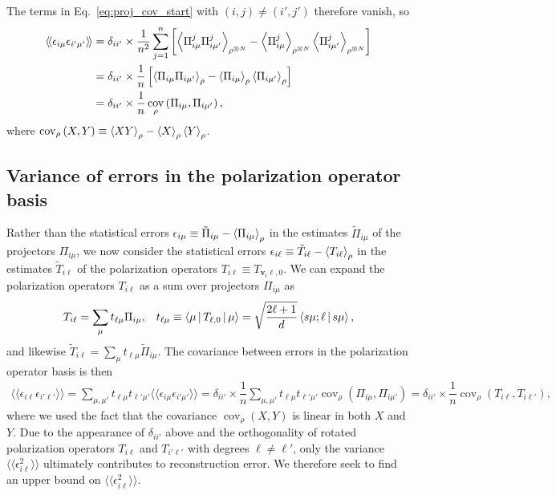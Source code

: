 \documentclass[notitlepage,twocolumn]{revtex4-2}
\newcommand{\f}[2]{\dfrac{#1}{#2}} %
\newcommand{\p}[1]{\left(#1\right)} %
\renewcommand{\sp}[1]{\left[#1\right]} %
\newcommand{\bk}{\Braket} %
\renewcommand{\v}{\bm} %
\newcommand{\bbk}[1]{\langle\!\langle #1 \rangle\!\rangle}
\DeclareMathOperator{\cov}{cov}
\begin{document}
The terms in Eq.~\eqref{eq:proj_cov_start} with $\p{i,j}\ne\p{i',j'}$ therefore vanish, so
\begin{align}
  \bbk{\epsilon_{i\mu} \epsilon_{i'\mu'}}
  &= \delta_{ii'} \times \f1{n^2} \sum_{j=1}^n \sp{\bk{\Pi_{i\mu}^j \Pi_{i\mu'}^j}_{\rho^{\otimes N}}
    - \bk{\Pi_{i\mu}^j}_{\rho^{\otimes N}}
    \bk{\Pi_{i\mu'}^j}_{\rho^{\otimes N}}} \\
  &= \delta_{ii'} \times \f1n \sp{\bk{\Pi_{i\mu} \Pi_{i\mu'}}_\rho
    - \bk{\Pi_{i\mu}}_\rho \bk{\Pi_{i\mu'}}_\rho} \\
  &= \delta_{ii'} \times \f1n \cov_\rho\p{\Pi_{i\mu}, \Pi_{i\mu'}},
\end{align}
where $\cov_\rho\p{X,Y} \equiv \bk{XY}_\rho - \bk{X}_\rho \bk{Y}_\rho$.

\subsection{Variance of errors in the polarization operator basis}

Rather than the statistical errors $\epsilon_{i\mu} \equiv \tilde\Pi_{i\mu} - \bk{\Pi_{i\mu}}_\rho$ in the estimates $\tilde\Pi_{i\mu}$ of the projectors $\Pi_{i\mu}$, we now consider the statistical errors $\epsilon_{i\ell} \equiv \tilde T_{i\ell} - \bk{T_{i\ell}}_\rho$ in the estimates $\tilde T_{i\ell}$ of the polarization operators $T_{i\ell} \equiv T_{\v v_i\ell,0}$.
We can expand the polarization operators $T_{i\ell}$ as a sum over projectors $\Pi_{i\mu}$ as
\begin{align}
  T_{i\ell} = \sum_\mu t_{\ell\mu} \Pi_{i\mu},
  &&
  t_{\ell\mu} \equiv \bk{\mu|T_{\ell,0}|\mu}
  = \sqrt{\f{2\ell+1}{d}} \bk{s\mu;\ell|s\mu},
\end{align}
and likewise $\tilde T_{i\ell} = \sum_\mu t_{\ell\mu} \tilde\Pi_{i\mu}$.
The covariance between errors in the polarization operator basis is then
\begin{align}
  \bbk{\epsilon_{i\ell} \epsilon_{i'\ell'}}
  = \sum_{\mu,\mu'} t_{\ell\mu} t_{\ell'\mu'}
  \bbk{\epsilon_{i\mu} \epsilon_{i'\mu'}}
  = \delta_{ii'} \times \f1n
  \sum_{\mu,\mu'} t_{\ell\mu} t_{\ell'\mu'}
  \cov_\rho\p{\Pi_{i\mu}, \Pi_{i\mu'}}
  = \delta_{ii'} \times \f1n \cov_\rho\p{T_{i\ell}, T_{i\ell'}},
\end{align}
where we used the fact that the covariance $\cov_\rho\p{X,Y}$ is linear in both $X$ and $Y$.
Due to the appearance of $\delta_{ii'}$ above and the orthogonality of rotated polarization operators $T_{i\ell}$ and $T_{i'\ell'}$ with degrees $\ell\ne\ell'$, only the variance $\bbk{\epsilon_{i\ell}^2}$ ultimately contributes to reconstruction error.
We therefore seek to find an upper bound on $\bbk{\epsilon_{i\ell}^2}$.
\end{document}
